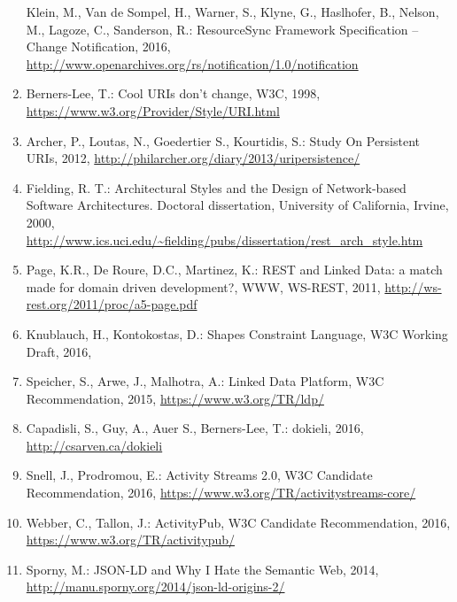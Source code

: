 \documentclass[]{article}
\begin{document}
\begin{enumerate}
  Klein, M., Van de Sompel, H., Warner, S., Klyne, G., Haslhofer, B.,
  Nelson, M., Lagoze, C., Sanderson, R.: ResourceSync Framework
  Specification -- Change Notification, 2016,
  \url{http://www.openarchives.org/rs/notification/1.0/notification}
\item
  \hypertarget{ref-11}{}

  Berners-Lee, T.: Cool URIs don't change, W3C, 1998,
  \url{https://www.w3.org/Provider/Style/URI.html}
\item
  \hypertarget{ref-12}{}

  Archer, P., Loutas, N., Goedertier S., Kourtidis, S.: Study On
  Persistent URIs, 2012,
  \url{http://philarcher.org/diary/2013/uripersistence/}
\item
  \hypertarget{ref-13}{}

  Fielding, R. T.: Architectural Styles and the Design of Network-based
  Software Architectures. Doctoral dissertation, University of
  California, Irvine, 2000,
  \url{http://www.ics.uci.edu/~fielding/pubs/dissertation/rest_arch_style.htm}
\item
  \hypertarget{ref-14}{}

  Page, K.R., De Roure, D.C., Martinez, K.: REST and Linked Data: a
  match made for domain driven development?, WWW, WS-REST, 2011,
  \url{http://ws-rest.org/2011/proc/a5-page.pdf}
\item
  \hypertarget{ref-15}{}

  Knublauch, H., Kontokostas, D.: Shapes Constraint Language, W3C
  Working Draft, 2016, \href{https://www.w3.org/TR/shacl/}{}
\item
  \hypertarget{ref-16}{}

  Speicher, S., Arwe, J., Malhotra, A.: Linked Data Platform, W3C
  Recommendation, 2015, \url{https://www.w3.org/TR/ldp/}
\item
  \hypertarget{ref-17}{}

  Capadisli, S., Guy, A., Auer S., Berners-Lee, T.: dokieli, 2016,
  \url{http://csarven.ca/dokieli}
\item
  \hypertarget{ref-18}{}

  Snell, J., Prodromou, E.: Activity Streams 2.0, W3C Candidate
  Recommendation, 2016,
  \url{https://www.w3.org/TR/activitystreams-core/}
\item
  \hypertarget{ref-19}{}

  Webber, C., Tallon, J.: ActivityPub, W3C Candidate Recommendation,
  2016, \url{https://www.w3.org/TR/activitypub/}
\item
  \hypertarget{ref-20}{}

  Sporny, M.: JSON-LD and Why I Hate the Semantic Web, 2014,
  \url{http://manu.sporny.org/2014/json-ld-origins-2/}
\end{enumerate}
\end{document}
